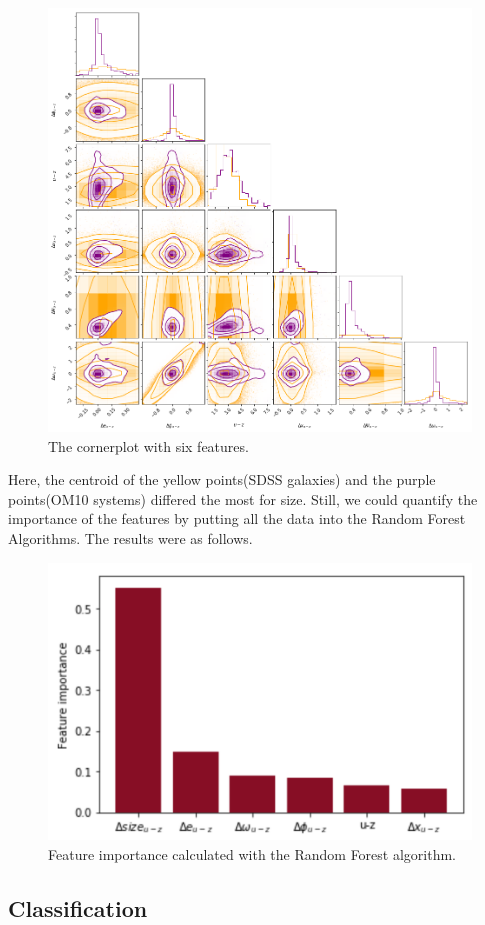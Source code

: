 \documentclass[\docopts]{\docclass}
\begin{document}
\begin{figure}
\includegraphics[width=0.9\columnwidth]{cornerplot.png}
\caption{The cornerplot with six features.}
 \label{fig:cornerplot}
\end{figure}

Here, the centroid of the yellow points(SDSS galaxies) and the purple points(OM10 systems) differed the most for size. Still, we could quantify the importance of the features by putting all the data into the Random Forest Algorithms. The results were as follows.

\begin{figure}[!h]
\includegraphics[width=0.4\columnwidth]{FeatureImportance.png}
\caption{Feature importance calculated with the Random Forest algorithm.}
 \label{fig:featureimportance}
\end{figure}

\subsection{Classification}
\label{subsec:classification_data}
\end{document}
